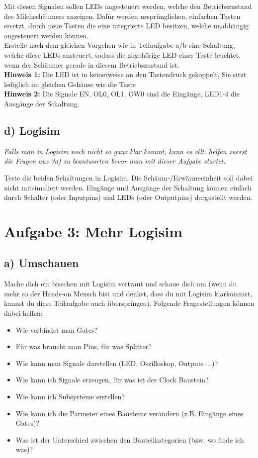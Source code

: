\documentclass[a4paper]{scrartcl}
\begin{document}
Mit diesen Signalen sollen LEDs angesteuert werden, welche den Betriebszustand des Milchschäumers anzeigen. Dafür werden ursprünglichen, einfachen Tasten ersetzt, durch neue Tasten die eine integrierte LED besitzen, welche unabhängig angesteuert werden können.\\


Erstelle nach dem gleichen Vorgehen wie in Teilaufgabe a/b eine Schaltung, welche diese LEDs ansteuert, sodass die zugehörige LED einer Taste leuchtet, wenn der Schäumer gerade in diesem Betriebszustand ist.\\
\textbf{Hinweis 1:} Die LED ist in keinerweise an den Tastendruck gekoppelt, Sie sitzt lediglich im gleichen Gehäuse wie die Taste\\
\textbf{Hinweis 2:} Die Signale EN, OL0, OL1, OW0 sind die Eingänge, LED1-4 die Ausgänge der Schaltung.

\subsection*{d) Logisim}
\textit{Falls man in Logisim noch nicht so ganz klar kommt, kann es vllt. helfen zuerst die Fragen aus 3a) zu beantworten bevor man mit dieser Aufgabe startet.\\}


Teste die beiden Schaltungen in Logisim. Die Schäum-/Erwärmeeinheit soll dabei nicht mitsimuliert werden. Eingänge und Ausgänge der Schaltung können einfach durch Schalter (oder Inputpins) und LEDs (oder Outputpins) dargestellt werden.


\section*{Aufgabe 3: Mehr Logisim}
\subsection*{a) Umschauen}
Mache dich ein bisschen mit Logisim vertraut und schaue dich um (wenn du mehr so der Hands-on Mensch bist und denkst, dass du mit Logisim klarkommst, kannst du diese Teilaufgabe auch überspringen). Folgende Fragestellungen können dabei helfen:
\begin{itemize}
	\item Wie verbindet man Gates?
	\item Für was braucht man Pins, für was Splitter?
	\item Wie kann man Signale darstellen (LED, Oszilloskop, Outputs ...)?
	\item Wie kann ich Signale erzeugen, für was ist der Clock Baustein?
	\item Wie kann ich Subsysteme erstellen?
	\item Wie kann ich die Parmeter eines Bausteins verändern (z.B. Eingänge eines Gates)?
	\item Was ist der Unterschied zwischen den Bauteilkategorien (bzw. wo finde ich was)?
\end{itemize}
\end{document}
